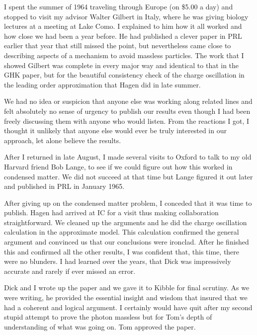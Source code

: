 \documentclass[12pt]{article}
\begin{document}
   I spent the summer of 1964 traveling through Europe (on \$5.00 a
   day) and stopped to visit my advisor Walter Gilbert in Italy, where
   he was giving biology lectures at a meeting at Lake Como.  I
   explained to him how it all worked and how close we had been a year
   before. He had published a clever paper in PRL \cite{wg;1964}
   earlier that year that still missed the point, but nevertheless
   came close to describing aspects of a mechanism to avoid massless
   particles. The work that I showed Gilbert was complete in every
   major way and identical to that in the GHK paper, but for the
   beautiful consistency check of the charge oscillation in the
   leading order approximation that Hagen did in late summer.

   We had no idea or suspicion that anyone else was working along
   related lines and felt absolutely no sense of urgency to publish
   our results even though I had been freely discussing them with
   anyone who would listen. From the reactions I got, I thought it
   unlikely that anyone else would ever be truly interested in our
   approach, let alone believe the results.

   After I returned in late August, I made several visits to Oxford to
   talk to my old Harvard friend Bob Lange, to see if we could figure
   out how this worked in condensed matter.  We did not succeed at
   that time but Lange figured it out later and published in PRL
   \cite{rvl;1965} in January 1965.

   After giving up on the condensed matter problem, I conceded that it
   was time to publish.  Hagen had arrived at IC for a visit thus
   making collaboration straightforward. We cleaned up the arguments
   and he did the charge oscillation calculation in the approximate
   model. This calculation confirmed the general argument and
   convinced us that our conclusions were ironclad. After he finished
   this and confirmed all the other results, I was confident that,
   this time, there were no blunders. I had learned over the years,
   that Dick was impressively accurate and rarely if ever missed an
   error.

   Dick and I wrote up the paper and we gave it to Kibble for final
   scrutiny. As we were writing, he provided the essential insight and
   wisdom that insured that we had a coherent and logical argument. I
   certainly would have quit after my second stupid attempt to prove
   the photon massless but for Tom's depth of understanding of what
   was going on. Tom approved the paper.
\end{document}
